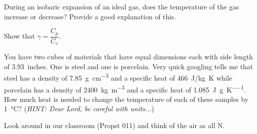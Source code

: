 \documentclass[letterpaper,12pt,addpoints]{exam}
\begin{document}
\begin{questions}
		\question[5]
		During an isobaric expansion of an ideal gas, does the temperature of the gas increase or decrease? Provide a good explanation of this. 
		
		\newpage
		\question[5]
		Show that $\gamma = \dfrac{C_p}{C_v}$. 		
		
		\vspace{3in}
		\question[5] You have two cubes of materials that have equal dimensions each with side length of \SI{3.93}{inches}. One is steel and one is porcelain. Very quick googling tells me that steel has a density of \SI{7.85}{\gram \per \centi\meter^3} and a specific heat of \SI{466}{J/kg K} while porcelain has a density of \SI{2400}{\kilo\gram \per \meter^3} and a specific heat of \SI{1.085}{\joule \per \gram \per \kelvin}. How much heat is needed to change the temperature of each of these samples by \SI{1}{\celsius}? (\emph{HINT: Dear Lord, be careful with units...})
		
		\newpage
		\question 
		Look around in our classroom (Propst 011) and think of the air as all N.
\end{questions}
\end{document}
